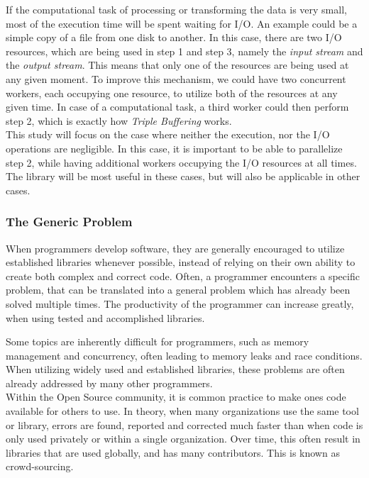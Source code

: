 \documentclass[a4paper]{article}
\begin{document}
If the computational task of processing or transforming the data is very small, most of the execution time will be spent waiting for I/O. An example could be a simple copy of a file from one disk to another. In this case, there are two I/O resources, which are being used in step 1 and step 3, namely the \textit{input stream} and the \textit{output stream}. This means that only one of the resources are being used at any given moment. To improve this mechanism, we could have two concurrent workers, each occupying one resource, to utilize both of the resources at any given time. In case of a computational task, a third worker could then perform step 2, which is exactly how \textit{Triple Buffering} works.\\

This study will focus on the case where neither the execution, nor the I/O operations are negligible. In this case, it is important to be able to parallelize step 2, while having additional workers occupying the I/O resources at all times. The library will be most useful in these cases, but will also be applicable in other cases.


\subsubsection{The Generic Problem}
When programmers develop software, they are generally encouraged to utilize established libraries whenever possible, instead of relying on their own ability to create both complex and correct code. Often, a programmer encounters a specific problem, that can be translated into a general problem which has already been solved multiple times. The productivity of the programmer can increase greatly, when using tested and accomplished libraries. 

Some topics are inherently difficult for programmers, such as memory management and concurrency, often leading to memory leaks and race conditions. When utilizing widely used and established libraries, these problems are often already addressed by many other programmers.\\

Within the Open Source community, it is common practice to make ones code available for others to use. In theory, when many organizations use the same tool or library, errors are found, reported and corrected much faster than when code is only used privately or within a single organization. Over time, this often result in libraries that are used globally, and has many contributors. This is known as crowd-sourcing.\\
\end{document}
